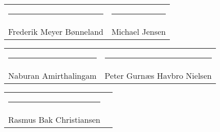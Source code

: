\vspace{1cm}
\begin{center}
\begin{tabular}{cc}
    \rule{6.5cm}{0.5pt}  & \rule{6.5cm}{0.5pt} \\
    Frederik Meyer Bønneland & Michael Jensen
\end{tabular}

\vspace{1cm}
\begin{tabular}{cc}
    \rule{6.5cm}{0.5pt} & \rule{6.5cm}{0.5pt} \\
    Naburan Amirthalingam & Peter Gurnæs Havbro Nielsen
\end{tabular}

\vspace{1cm}
\begin{tabular}{cc}
    \rule{6.5cm}{0.5pt} \\
    Rasmus Bak Christiansen
\end{tabular}
\end{center}